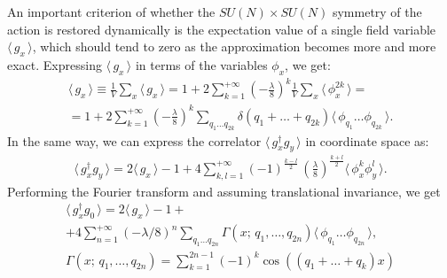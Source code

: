 \documentclass[12pt]{article}
\newcommand{\lr}[1]{ \left( #1 \right) }
\newcommand{\vev}[1]{ \langle \, #1 \, \rangle }
\begin{document}
 An important criterion of whether the $SU\lr{N} \times SU\lr{N}$ symmetry of the action is restored dynamically is the expectation value of a single field variable $\vev{g_x}$, which should tend to zero as the approximation becomes more and more exact. Expressing $\vev{g_x}$ in terms of the variables $\phi_x$, we get:
\begin{eqnarray}
\label{gx_vev_momentum}
 \vev{g_x} \equiv \frac{1}{V} \sum\limits_x \vev{g_x}
 = 
 1 + 2 \sum\limits_{k=1}^{+\infty} \lr{-\frac{\lambda}{8}}^k \frac{1}{V} \sum\limits_x \vev{\phi_x^{2 k}}
 = \nonumber \\ = 
 1 + 2 \sum\limits_{k=1}^{+\infty} \lr{-\frac{\lambda}{8}}^k
 \sum\limits_{q_1 \ldots q_{2 k}}
 \delta\lr{q_1 + \ldots + q_{2 k}}
 \vev{\phi_{q_1} \ldots \phi_{q_{2k}}} .
\end{eqnarray}
In the same way, we can express the correlator $\vev{g^{\dag}_x g_y}$ in coordinate space as:
\begin{eqnarray}
\label{gx_vev_space}
 \vev{g^{\dag}_x g_y} 
 =
 2 \vev{g_x} - 1
 +
 4 \sum\limits_{k,l=1}^{+\infty}
 \lr{-1}^{\frac{k-l}{2}} \, \lr{\frac{\lambda}{8}}^{\frac{k+l}{2}}
 \vev{\phi_x^k \phi_y^l} .
\end{eqnarray}
Performing the Fourier transform and assuming translational invariance, we get
\begin{eqnarray}
\label{gx_vev_momentum}
 \vev{g^{\dag}_x g_0} 
 =
 2 \vev{g_x} - 1
 + \nonumber \\ +
 4 \sum\limits_{n=1}^{+\infty} \lr{-\lambda/8}^n
 \sum\limits_{q_1 \ldots q_{2 n}}
 \Gamma\lr{x; \, q_1, \ldots, q_{2 n}}
 \vev{\phi_{q_1} \ldots \phi_{q_{2 n}}} ,
 \nonumber \\
 \Gamma\lr{x; \, q_1, \ldots, q_{2 n}} = 
 \sum\limits_{k=1}^{2 n - 1} \lr{-1}^k \cos\lr{\lr{q_1 + \ldots + q_k} x}
\end{eqnarray}
\end{document}
